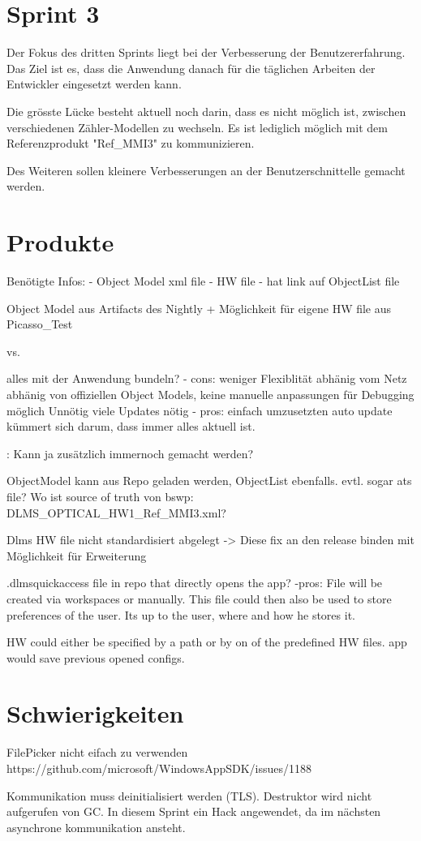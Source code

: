 \section{Sprint 3}
Der Fokus des dritten Sprints liegt bei der Verbesserung der Benutzererfahrung.
Das Ziel ist es, dass die Anwendung danach für die täglichen Arbeiten der Entwickler eingesetzt werden kann.

Die grösste Lücke besteht aktuell noch darin, dass es nicht möglich ist, zwischen verschiedenen Zähler-Modellen zu wechseln.
Es ist lediglich möglich mit dem Referenzprodukt "Ref\_MMI3" zu kommunizieren.

Des Weiteren sollen kleinere Verbesserungen an der Benutzerschnittelle gemacht werden.


\section{Produkte}
Benötigte Infos:
- Object Model xml file
- HW file
   - hat link auf ObjectList file

Object Model aus Artifacts des Nightly
+ Möglichkeit für eigene
HW file aus Picasso\_Test

vs.

alles mit der Anwendung bundeln?
- cons:
weniger Flexiblität
abhänig vom Netz
abhänig von offiziellen Object Models, keine manuelle anpassungen für Debugging möglich
Unnötig viele Updates nötig
- pros:
einfach umzusetzten
auto update kümmert sich darum, dass immer alles aktuell ist.

: Kann ja zusätzlich immernoch gemacht werden?


ObjectModel kann aus Repo geladen werden, ObjectList ebenfalls.
evtl. sogar ats file?
Wo ist source of truth von bswp: DLMS\_OPTICAL\_HW1\_Ref\_MMI3.xml?


Dlms HW file nicht standardisiert abgelegt
-> Diese fix an den release binden mit Möglichkeit für Erweiterung

.dlmsquickaccess file in repo that directly opens the app?
-pros:
File will be created via workspaces or manually.
This file could then also be used to store preferences of the user. Its up to the user, where and how he stores it.

HW could either be specified by a path or by on of the predefined HW files.
app would save previous opened configs.



\section{Schwierigkeiten}
FilePicker nicht eifach zu verwenden
https://github.com/microsoft/WindowsAppSDK/issues/1188

Kommunikation muss deinitialisiert werden (TLS). Destruktor wird nicht aufgerufen von GC. 
In diesem Sprint ein Hack angewendet, da im nächsten asynchrone kommunikation ansteht.
